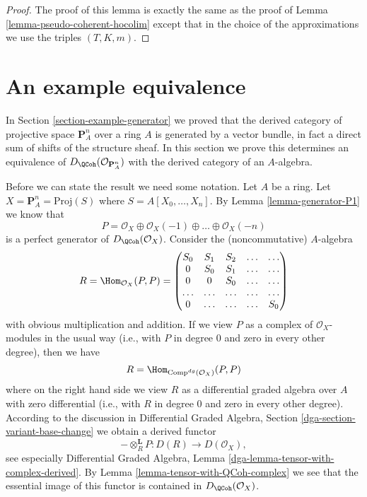 \begin{proof}
The proof of this lemma is exactly the same as the proof of
Lemma \ref{lemma-pseudo-coherent-hocolim}
except that in the choice of the approximations we use
the triples $(T, K, m)$.
\end{proof}









\section{An example equivalence}
\label{section-example-equivalence}

\noindent
In Section \ref{section-example-generator}
we proved that the derived category of projective space $\mathbf{P}^n_A$
over a ring $A$ is generated by a vector bundle, in fact a direct
sum of shifts of the structure sheaf. In this section we prove this
determines an equivalence of $D_\QCoh(\mathcal{O}_{\mathbf{P}^n_A})$
with the derived category of an $A$-algebra.

\medskip\noindent
Before we can state the result we need some notation.
Let $A$ be a ring. Let $X = \mathbf{P}^n_A = \text{Proj}(S)$
where $S = A[X_0, \ldots, X_n]$. By Lemma \ref{lemma-generator-P1}
we know that
\begin{equation}
\label{equation-generator-Pn}
P =
\mathcal{O}_X \oplus \mathcal{O}_X(-1) \oplus \ldots \oplus \mathcal{O}_X(-n)
\end{equation}
is a perfect generator of $D_\QCoh(\mathcal{O}_X)$.
Consider the (noncommutative) $A$-algebra
\begin{equation}
\label{equation-algebra-for-Pn}
R = \Hom_{\mathcal{O}_X}(P, P) =
\left(
\begin{matrix}
S_0 & S_1 & S_2 & \ldots & \ldots \\
0 & S_0 & S_1 & \ldots & \ldots\\
0 & 0 & S_0 & \ldots & \ldots \\
\ldots & \ldots & \ldots & \ldots & \ldots \\
0 & \ldots & \ldots & \ldots & S_0
\end{matrix}
\right)
\end{equation}
with obvious multiplication and addition. If we view $P$ as a complex
of $\mathcal{O}_X$-modules in the usual way (i.e., with $P$ in degree $0$
and zero in every other degree), then we have
$$
R = \Hom_{\text{Comp}^{dg}(\mathcal{O}_X)}(P, P)
$$
where on the right hand side we view $R$ as a differential graded algebra
over $A$
with zero differential (i.e., with $R$ in degree $0$ and zero in every
other degree). According to the discussion in
Differential Graded Algebra, Section \ref{dga-section-variant-base-change}
we obtain a derived functor
$$
- \otimes_R^\mathbf{L} P : D(R) \longrightarrow D(\mathcal{O}_X),
$$
see especially Differential Graded Algebra, Lemma
\ref{dga-lemma-tensor-with-complex-derived}.
By Lemma \ref{lemma-tensor-with-QCoh-complex}
we see that the essential image of this functor
is contained in $D_\QCoh(\mathcal{O}_X)$.

